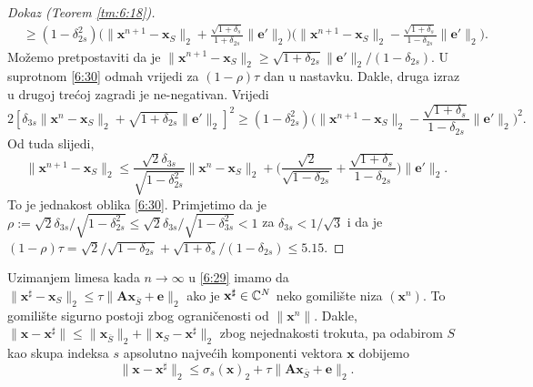 \documentclass[a4paper,twoside,12pt]{memoir} %
\newcommand{\vect}[1]{\mathbf{#1}}
\renewcommand{\vec}{\vect}
\newcommand{\norm}[1]{\|{#1}\|}
\begin{document}
\begin{proof}[Dokaz (Teorem \ref{tm:6:18})]
\begin{align*}
        &\geq(1-\delta_{2s}^2)\big( \norm{\vec x^{n+1} - \vec x_S}_2 + \frac{\sqrt{1+\delta_s}}{1+\delta_{2s}} \norm{\vec e'}_2  \big)\big( \norm{\vec x^{n+1} - \vec x_S}_2 - \frac{\sqrt{1+\delta_s}}{1-\delta_{2s}} \norm{\vec e'}_2 \big).
    \end{align*}
    Mo\v{z}emo pretpostaviti da je $\norm{\vec x^{n+1} - \vec x_S}_2 \geq \sqrt{1+\delta_{2s}}\norm{\vec e'}_2 / (1- \delta_{2s})$. U suprotnom \eqref{6:30} odmah vrijedi za $(1-\rho)\tau$ dan u nastavku. Dakle, druga izraz u drugoj tre\'coj zagradi je ne-negativan. Vrijedi
    \begin{equation*}
        2[\delta_{3s} \norm{\vec x^n - \vec x_S}_2 + \sqrt{1+\delta_{2s}}\norm{\vec e'}_2]^2 \geq (1-\delta_{2s}^2) \big( \norm{\vec x^{n+1} - \vec x_S}_2 - \frac{\sqrt{1+\delta_s}}{1-\delta_{2s}} \norm{\vec e'}_2  \big)^2.
    \end{equation*}
    Od tuda slijedi,
    \begin{equation*}
        \norm{\vec x^{n+1} - \vec x_S}_2 \leq \frac{\sqrt{2} \delta_{3s}}{\sqrt{1-\delta_{2s}^{2}}} \norm{\vec x^n - \vec x_S}_2 + \big( \frac{\sqrt{2}}{\sqrt{1-\delta_{2s}}} + \frac{\sqrt{1+\delta_s}}{1-\delta_{2s}}   \big) \norm{\vec e'}_2.
    \end{equation*}
    To je jednakost oblika \eqref{6:30}. Primjetimo da je $\rho := \sqrt{2}\delta_{3s}/\sqrt{1-\delta_{2s}^2} \leq \sqrt{2} \delta_{3s}/\sqrt{1-\delta_{3s}^2} < 1$ za $\delta_{3s} < 1/\sqrt{3}$ i da je $(1-\rho)\tau = \sqrt{2}/\sqrt{1-\delta_{2s}} + \sqrt{1+\delta_s}/(1-\delta_{2s}) \leq 5.15$.
\end{proof}
Uzimanjem limesa kada $n \rightarrow \infty$ u \eqref{6:29} imamo da $\norm{\vec x^{\sharp}  - \vec x_S}_2 \leq \tau \norm{\vec{Ax}_{\bar S} + \vec e}_2$ ako je $\vec x^{\sharp} \in \C^N$ neko gomili\v{s}te niza $(\vec x^n)$. To gomili\v{s}te sigurno postoji zbog ograni\v{c}enosti od $\norm{\vec x^n}$. Dakle, $\norm{\vec x - \vec x^{\sharp}} \leq \norm{\vec x_{\bar S}}_2 + \norm{\vec x_S - \vec x^{\sharp}}_2$ zbog nejednakosti trokuta, pa odabirom $S$ kao skupa indeksa $s$ apsolutno najve\'cih komponenti vektora $\vec x$ dobijemo
\begin{equation}\label{6:32}
    \norm{\vec x - \vec x^{\sharp}}_2 \leq \sigma_s(\vec x)_2 + \tau \norm{\vec{Ax}_{\bar S} + \vec e}_2.
\end{equation}
\end{document}

